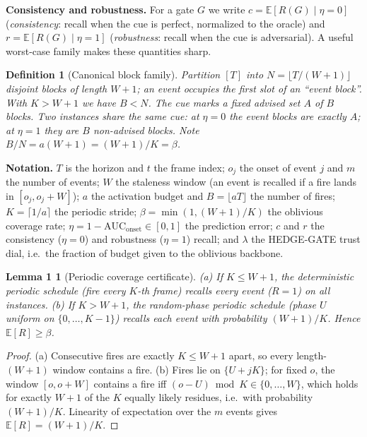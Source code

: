 ﻿\documentclass[lettersize,journal]{IEEEtran}
\newtheorem*{lem}{Lemma 1}
\newtheorem*{defn}{Definition}
\begin{document}
\textbf{Consistency and robustness.} For a gate $G$ we write $c=\mathbb E[R(G)\mid \eta{=}0]$ (\emph{consistency}: recall when the cue is perfect, normalized to the oracle) and $r=\mathbb E[R(G)\mid\eta{=}1]$ (\emph{robustness}: recall when the cue is adversarial). A useful worst-case family makes these quantities sharp.

\begin{defn}[Canonical block family]
Partition $[T]$ into $N=\lfloor T/(W{+}1)\rfloor$ disjoint blocks of length $W{+}1$; an event occupies the first slot of an ``event block''. With $K>W{+}1$ we have $B<N$. The cue marks a fixed \emph{advised} set $A$ of $B$ blocks. Two instances share the \emph{same} cue: at $\eta{=}0$ the event blocks are exactly $A$; at $\eta{=}1$ they are $B$ \emph{non-advised} blocks. Note $B/N=a(W{+}1)=(W{+}1)/K=\beta$.
\end{defn}

\noindent\textbf{Notation.} $T$ is the horizon and $t$ the frame index; $o_j$ the onset of event $j$ and $m$ the number of events; $W$ the staleness window (an event is recalled if a fire lands in $[o_j,o_j{+}W]$); $a$ the activation budget and $B=\lfloor aT\rfloor$ the number of fires; $K=\lceil1/a\rceil$ the periodic stride; $\beta=\min(1,(W{+}1)/K)$ the oblivious coverage rate; $\eta=1-\mathrm{AUC}_{\text{onset}}\in[0,1]$ the prediction error; $c$ and $r$ the consistency ($\eta{=}0$) and robustness ($\eta{=}1$) recall; and $\lambda$ the HEDGE-GATE trust dial, i.e.\ the fraction of budget given to the oblivious backbone.

\begin{lem}[Periodic coverage certificate]
\emph{(a)} If $K\le W{+}1$, the deterministic periodic schedule (fire every $K$-th frame) recalls every event ($R=1$) on all instances. \emph{(b)} If $K>W{+}1$, the random-phase periodic schedule (phase $U$ uniform on $\{0,\dots,K{-}1\}$) recalls each event with probability $(W{+}1)/K$. Hence $\mathbb E[R]\ge\beta$.
\end{lem}
\begin{proof}
(a) Consecutive fires are exactly $K\le W{+}1$ apart, so every length-$(W{+}1)$ window contains a fire. (b) Fires lie on $\{U+jK\}$; for fixed $o$, the window $[o,o{+}W]$ contains a fire iff $(o-U)\bmod K\in\{0,\dots,W\}$, which holds for exactly $W{+}1$ of the $K$ equally likely residues, i.e.\ with probability $(W{+}1)/K$. Linearity of expectation over the $m$ events gives $\mathbb E[R]=(W{+}1)/K$.
\end{proof}
\end{document}
